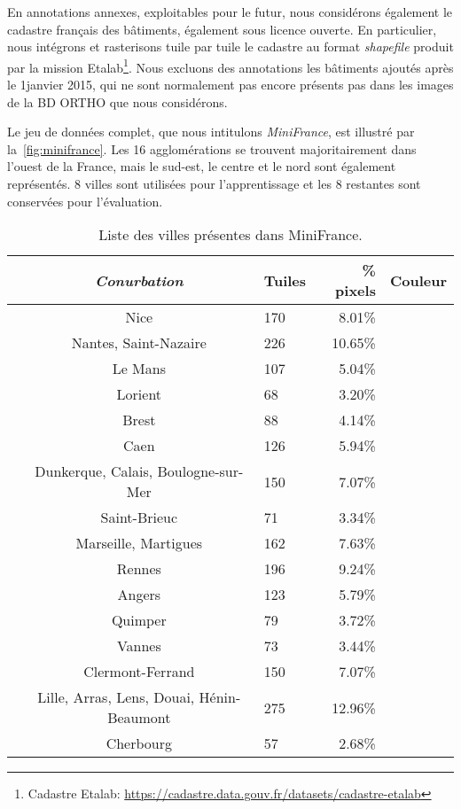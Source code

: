 En annotations annexes, exploitables pour le futur, nous considérons également le cadastre français des bâtiments, également sous licence ouverte. En particulier, nous intégrons et rasterisons tuile par tuile le cadastre au format \emph{shapefile} produit par la mission Etalab\footnote{Cadastre Etalab: \url{https://cadastre.data.gouv.fr/datasets/cadastre-etalab}}. Nous excluons des annotations les bâtiments ajoutés après le 1\ier janvier 2015, qui ne sont normalement pas encore présents pas dans les images de la BD ORTHO que nous considérons.

Le jeu de données complet, que nous intitulons \emph{MiniFrance}, est illustré par la~\cref{fig:minifrance}. Les 16 agglomérations se trouvent majoritairement dans l'ouest de la France, mais le sud-est, le centre et le nord sont également représentés. 8 villes sont utilisées pour l'apprentissage et les 8 restantes sont conservées pour l'évaluation.

\begin{table}[h]
\caption{Liste des villes présentes dans MiniFrance.}
\label{tab:minifrance}
	\begin{tabularx}{\textwidth}{c c Y r Y}
	\toprule
	& \emph{Conurbation} &  Tuiles &  \% pixels & Couleur \\
	\midrule
	 & Nice & 170 & \num{8.01}\% &  \\
	& Nantes, Saint-Nazaire  & 226 & \num{10.65}\% &  \\
	& Le Mans & 107 & \num{5.04}\% &   \\
	& Lorient & 68 & \num{3.20}\%  &  \\
	& Brest & 88  & \num{4.14}\% &  \\
	& Caen & 126 & \num{5.94}\%  &   \\
	& Dunkerque, Calais, Boulogne-sur-Mer & 150 & \num{7.07}\% &   \\
	& Saint-Brieuc & 71 &  \num{3.34}\% &  \\
	\midrule
	 & Marseille, Martigues & 162 & \num{7.63}\% &  \\
	& Rennes & 196 & \num{9.24}\% &  \\
	& Angers & 123  & \num{5.79}\% & \\
	& Quimper & 79 & \num{3.72}\% & \\
	& Vannes & 73 & \num{3.44}\% & \\
	& Clermont-Ferrand & 150 & \num{7.07}\% & \\
	& Lille, Arras, Lens, Douai, Hénin-Beaumont & 275 & \num{12.96}\% & \\
	& Cherbourg & 57 & \num{2.68}\% & \\ \bottomrule
	\end{tabularx}
\end{table}

